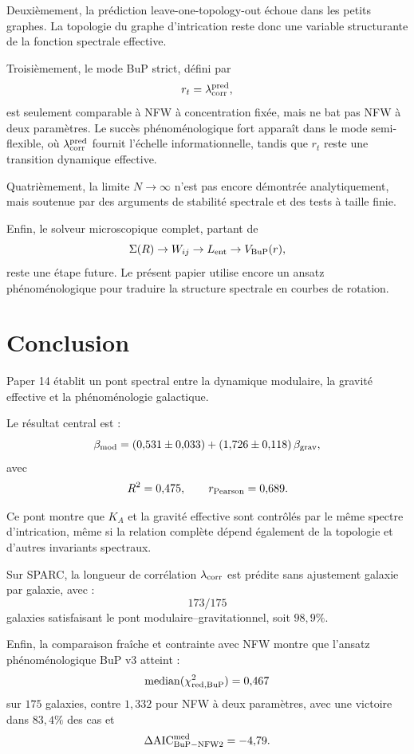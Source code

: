 \documentclass[11pt,a4paper]{article}
\begin{document}
Deuxièmement, la prédiction leave-one-topology-out échoue dans les petits
graphes. La topologie du graphe d'intrication reste donc une variable
structurante de la fonction spectrale effective.

Troisièmement, le mode BuP strict, défini par
\[
r_t=\lambda_{\rm corr}^{\rm pred},
\]
est seulement comparable à NFW à concentration fixée, mais ne bat pas NFW à
deux paramètres. Le succès phénoménologique fort apparaît dans le mode
semi-flexible, où \(\lambda_{\rm corr}^{\rm pred}\) fournit l'échelle
informationnelle, tandis que \(r_t\) reste une transition dynamique effective.

Quatrièmement, la limite \(N\to\infty\) n'est pas encore démontrée
analytiquement, mais soutenue par des arguments de stabilité spectrale et
des tests à taille finie.

Enfin, le solveur microscopique complet, partant de
\[
\Sigma(R)
\rightarrow
W_{ij}
\rightarrow
L_{\rm ent}
\rightarrow
V_{\rm BuP}(r),
\]
reste une étape future. Le présent papier utilise encore un ansatz
phénoménologique pour traduire la structure spectrale en courbes de rotation.

\section{Conclusion}

Paper 14 établit un pont spectral entre la dynamique modulaire, la gravité
effective et la phénoménologie galactique.

Le résultat central est :
\[
\beta_{\rm mod}
=
(0{,}531 \pm 0{,}033)
+
(1{,}726 \pm 0{,}118)\,\beta_{\rm grav},
\]
avec
\[
R^2=0{,}475,
\qquad
r_{\rm Pearson}=0{,}689.
\]

Ce pont montre que \(K_A\) et la gravité effective sont contrôlés par le même
spectre d'intrication, même si la relation complète dépend également de la
topologie et d'autres invariants spectraux.

Sur SPARC, la longueur de corrélation \(\lambda_{\rm corr}\) est prédite sans
ajustement galaxie par galaxie, avec :
\[
173/175
\]
galaxies satisfaisant le pont modulaire--gravitationnel, soit \(98{,}9\%\).

Enfin, la comparaison fraîche et contrainte avec NFW montre que l'ansatz
phénoménologique BuP v3 atteint :
\[
{\rm median}(\chi^2_{\rm red,BuP})=0{,}467
\]
sur \(175\) galaxies, contre \(1{,}332\) pour NFW à deux paramètres, avec une
victoire dans \(83{,}4\%\) des cas et
\[
\Delta{\rm AIC}_{\rm BuP-NFW2}^{\rm med}=-4{,}79.
\]
\end{document}
